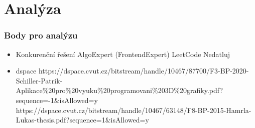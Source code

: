 
\chapter{Analýza}

\subsection{Body pro analýzu}
\begin{itemize}
    \item Konkurenční řešení
    \subitem AlgoExpert (FrontendExpert)
    \subitem LeetCode
    \subitem Nedatluj
    \item dspace
    \subitem https://dspace.cvut.cz/bitstream/handle/10467/87700/F3-BP-2020-Schiller-Patrik-Aplikace\%20pro\%20vyuku\%20programovani\%203D\%20grafiky.pdf?sequence=-1\&isAllowed=y
    \subitem https://dspace.cvut.cz/bitstream/handle/10467/63148/F8-BP-2015-Hamrla-Lukas-thesis.pdf?sequence=1\&isAllowed=y
\end{itemize}
